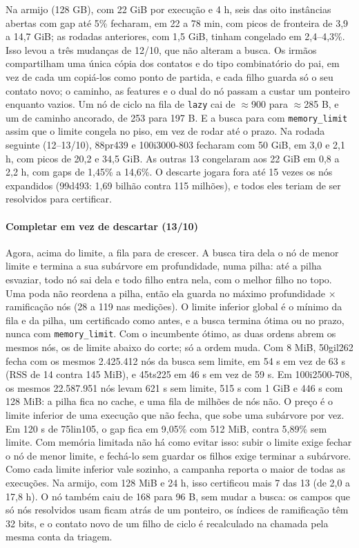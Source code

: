 \documentclass[11pt,a4paper]{article}
\theoremstyle{plain}\newtheorem{proposicao}{Proposição}
\theoremstyle{definition}\newtheorem{definicao}{Definição}
\theoremstyle{plain}\newtheorem{teorema}{Teorema}
\theoremstyle{plain}\newtheorem{lema}{Lema}
\newcommand{\code}[1]{\texttt{\small #1}}
\begin{document}
Na armijo (128 GB), com 22 GiB por execução e 4 h, seis das oito instâncias abertas com gap até 5\% fecharam, em 22 a 78 min, com picos de fronteira de 3,9 a 14,7 GiB; as rodadas anteriores, com 1,5 GiB, tinham congelado em 2,4–4,3\%. Isso levou a três mudanças de 12/10, que não alteram a busca. Os irmãos compartilham uma única cópia dos contatos e do tipo combinatório do pai, em vez de cada um copiá-los como ponto de partida, e cada filho guarda só o seu contato novo; o caminho, as features e o dual do nó passam a custar um ponteiro enquanto vazios. Um nó de ciclo na fila de \code{lazy} cai de \(\approx\)900 para \(\approx\)285 B, e um de caminho ancorado, de 253 para 197 B. E a busca para com \code{memory\_limit} assim que o limite congela no piso, em vez de rodar até o prazo. Na rodada seguinte (12–13/10), 88pr439 e 100i3000-803 fecharam com 50 GiB, em 3,0 e 2,1 h, com picos de 20,2 e 34,5 GiB. As outras 13 congelaram aos 22 GiB em 0,8 a 2,2 h, com gaps de 1,45\% a 14,6\%. O descarte jogara fora até 15 vezes os nós expandidos (99d493: 1,69 bilhão contra 115 milhões), e todos eles teriam de ser resolvidos para certificar.

\paragraph{Completar em vez de descartar (13/10)} Agora, acima do limite, a fila para de crescer. A busca tira dela o nó de menor limite e termina a sua subárvore em profundidade, numa pilha: até a pilha esvaziar, todo nó sai dela e todo filho entra nela, com o melhor filho no topo. Uma poda não reordena a pilha, então ela guarda no máximo profundidade \(\times\) ramificação nós (28 a 119 nas medições). O limite inferior global é o mínimo da fila e da pilha, um certificado como antes, e a busca termina ótima ou no prazo, nunca com \code{memory\_limit}. Com o incumbente ótimo, as duas ordens abrem os mesmos nós, os de limite abaixo do corte; só a ordem muda. Com 8 MiB, 50gil262 fecha com os mesmos 2.425.412 nós da busca sem limite, em 54 s em vez de 63 s (RSS de 14 contra 145 MiB), e 45ts225 em 46 s em vez de 59 s. Em 100i2500-708, os mesmos 22.587.951 nós levam 621 s sem limite, 515 s com 1 GiB e 446 s com 128 MiB: a pilha fica no cache, e uma fila de milhões de nós não. O preço é o limite inferior de uma execução que não fecha, que sobe uma subárvore por vez. Em 120 s de 75lin105, o gap fica em 9,05\% com 512 MiB, contra 5,89\% sem limite. Com memória limitada não há como evitar isso: subir o limite exige fechar o nó de menor limite, e fechá-lo sem guardar os filhos exige terminar a subárvore. Como cada limite inferior vale sozinho, a campanha reporta o maior de todas as execuções. Na armijo, com 128 MiB e 24 h, isso certificou mais 7 das 13 (de 2,0 a 17,8 h). O nó também caiu de 168 para 96 B, sem mudar a busca: os campos que só nós resolvidos usam ficam atrás de um ponteiro, os índices de ramificação têm 32 bits, e o contato novo de um filho de ciclo é recalculado na chamada pela mesma conta da triagem.
\end{document}
